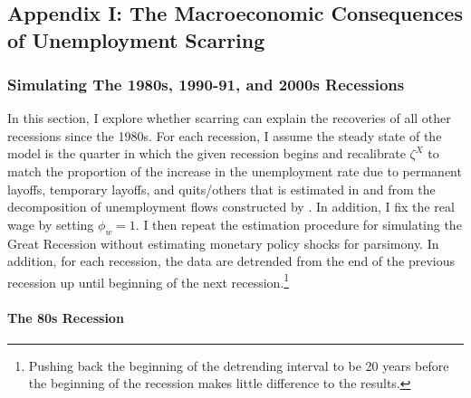 \footnotesize
\renewcommand{\thechapter}{\Roman{chapter}}

\renewcommand{\thesection}{\Alph{section}}



\pagebreak 

\chapter{}

\section{Appendix I: The Macroeconomic Consequences of Unemployment Scarring }

\subsection{Simulating The 1980s, 1990-91, and 2000s Recessions}

In this section, I explore whether scarring can explain the recoveries of all other recessions since the 1980s. For each recession, I assume the steady state of the model is the quarter in which the given recession begins and recalibrate $\zeta^{X}$ to match the proportion of the increase in the unemployment rate due to permanent layoffs, temporary layoffs, and quits/others that is estimated in \cite{Gertler2022} and from the decomposition of unemployment flows constructed by \cite{Fujita2017}. In addition, I fix the real wage by setting $\phi_{w} =1$.  I then repeat the estimation procedure for simulating the Great Recession without estimating monetary policy shocks for parsimony. In addition, for each recession, the data are detrended from the end of the previous recession up until beginning of the next recession.\footnote{ Pushing back the beginning of the detrending interval to be 20 years before the beginning of the recession makes little difference to the results. }

\subsubsection{The 80s Recession}

